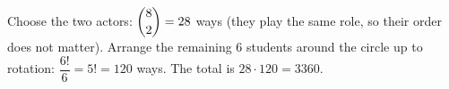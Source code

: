 Choose the two actors: $\dbinom82=28$ ways (they play the same role, so their order does not matter). Arrange the remaining $6$ students around the circle up to rotation: $\dfrac{6!}{6}=5!=120$ ways. The total is $28\cdot120=\boxed{3360}$.
